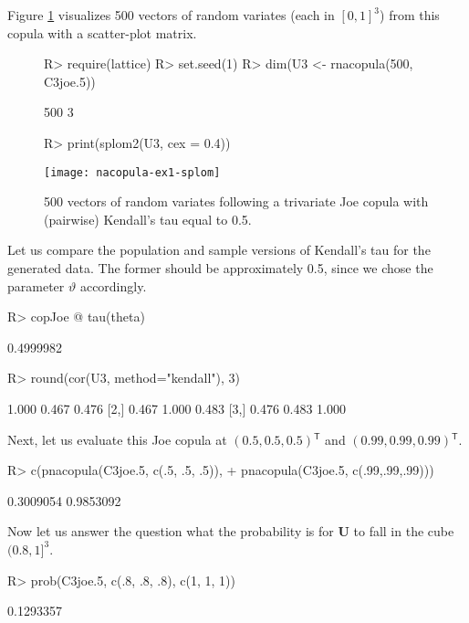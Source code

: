 \documentclass[nojss,article]{jss}
\theoremstyle{mythmstyle}
\newcommand*{\vt}{\vartheta}
\newcommand{\tr}{\ensuremath{^\mathsf{T}}}%
\newcommand*{\setcapwidth}[1]{}
\begin{document}
\pagebreak
Figure \ref{fig:AC_Joe} visualizes 500 vectors of random variates (each in $[0,1]^3$) from this copula with a scatter-plot matrix.
\begin{figure}[htbp]
\centering
\begin{Schunk}
\begin{Sinput}
R> require(lattice)
R> set.seed(1)
R> dim(U3 <- rnacopula(500, C3joe.5))
\end{Sinput}
\begin{Soutput}
[1] 500   3
\end{Soutput}
\begin{Sinput}
R> print(splom2(U3, cex = 0.4))
\end{Sinput}
\end{Schunk}
\texttt{[image: nacopula-ex1-splom]}
\setcapwidth{\textwidth}%
  \caption{500 vectors of random variates following a trivariate Joe copula with (pairwise) Kendall's tau equal to 0.5.}
  \label{fig:AC_Joe}
\end{figure}

Let us compare the population and sample versions of Kendall's tau for the
generated data. The former should be approximately 0.5, since we chose the parameter $\vt$ accordingly.
\begin{Schunk}
\begin{Sinput}
R> copJoe @ tau(theta)
\end{Sinput}
\begin{Soutput}
[1] 0.4999982
\end{Soutput}
\begin{Sinput}
R> round(cor(U3, method="kendall"), 3)
\end{Sinput}
\begin{Soutput}
      [,1]  [,2]  [,3]
[1,] 1.000 0.467 0.476
[2,] 0.467 1.000 0.483
[3,] 0.476 0.483 1.000
\end{Soutput}
\end{Schunk}

Next, let us evaluate this Joe copula at $(0.5,0.5,0.5)\tr$ and $(0.99,0.99,0.99)\tr$.
\begin{Schunk}
\begin{Sinput}
R> c(pnacopula(C3joe.5, c(.5, .5, .5)),
+    pnacopula(C3joe.5, c(.99,.99,.99)))
\end{Sinput}
\begin{Soutput}
[1] 0.3009054 0.9853092
\end{Soutput}
\end{Schunk}

Now let us answer the question what the probability is for $\bm{U}$ to fall in
the cube $(0.8,1]^3$.
\begin{Schunk}
\begin{Sinput}
R> prob(C3joe.5, c(.8, .8, .8), c(1, 1, 1))
\end{Sinput}
\begin{Soutput}
[1] 0.1293357
\end{Soutput}
\end{Schunk}
\end{document}
